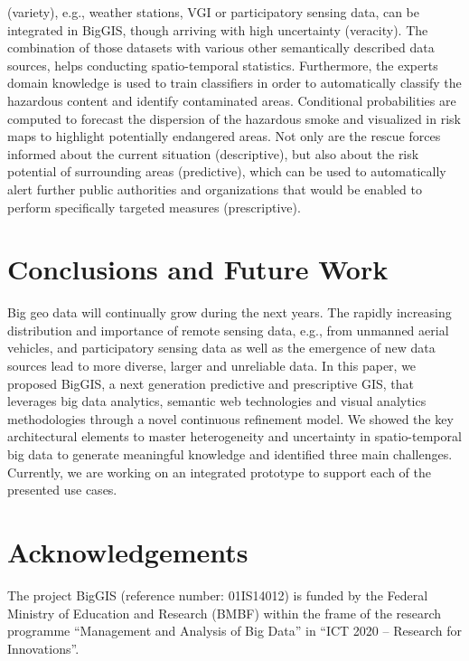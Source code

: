 \documentclass{sig-alternate-05-2015}
\begin{document}
(variety), e.g., weather stations, VGI or participatory sensing data, can be
integrated in BigGIS, though arriving with high uncertainty (veracity). The
combination of those datasets with various other semantically described data
sources, helps conducting spatio-temporal statistics. Furthermore, the experts
domain knowledge is used to train classifiers in order to automatically
classify the hazardous content and identify contaminated areas. Conditional
probabilities are computed to forecast the dispersion of the hazardous smoke
and visualized in risk maps to highlight potentially endangered areas. Not only
are the rescue forces informed about the current situation (descriptive), but
also about the risk potential of surrounding areas (predictive), which can be
used to automatically alert further public authorities and organizations that
would be enabled to perform specifically targeted measures (prescriptive).

\section{Conclusions and Future Work}
\label{sec:concl}
Big geo data will continually grow during the next years. The
rapidly increasing distribution and importance of remote sensing data, e.g.,
from unmanned aerial vehicles, and participatory sensing data as well as the
emergence of new data sources lead to more diverse, larger and unreliable data.
In this paper, we proposed BigGIS, a next generation predictive and
prescriptive GIS, that leverages big data analytics, semantic web technologies
and visual analytics methodologies through a novel continuous refinement model.
We showed the key architectural elements to master heterogeneity and
uncertainty in spatio-temporal big data to generate meaningful knowledge and
identified three main challenges. Currently, we are working on an integrated
prototype to support each of the presented use cases.


\section{Acknowledgements}
\label{sec:ack}
The project BigGIS (reference number: 01IS14012) is funded by the Federal
Ministry of Education and Research (BMBF) within the frame of the research
programme ``Management and Analysis of Big Data'' in ``ICT 2020 --
Research for Innovations''.

%

%
%
\end{document}
